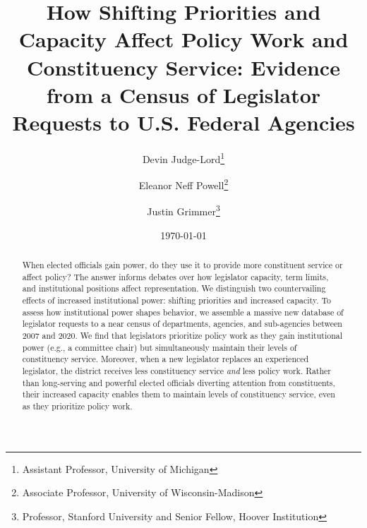 \documentclass[12pt]{article}
\title{How Shifting Priorities and Capacity Affect Policy Work and Constituency Service: Evidence from a Census of Legislator Requests to U.S. Federal Agencies}
\author{Devin Judge-Lord\thanks{Assistant Professor, University of Michigan} \and Eleanor Neff Powell\thanks{Associate Professor, University of Wisconsin-Madison} \and Justin Grimmer\thanks{Professor, Stanford University and Senior Fellow, Hoover Institution} }
\date{\today}
\begin{document}
\maketitle

\begin{abstract}
When elected officials gain power, do they use it to provide more constituent service or affect policy? The answer informs debates over how legislator capacity, term limits, and institutional positions affect representation. 
We distinguish two countervailing effects of increased institutional power: shifting priorities and increased capacity. 
To assess how institutional power shapes behavior, we assemble a massive new database of  legislator requests to a near census of departments, agencies, and sub-agencies between 2007 and 2020.
We find that legislators prioritize policy work as they gain institutional power (e.g., a committee chair) but simultaneously maintain their levels of constituency service.
Moreover, when a new legislator replaces an experienced legislator, the district receives less constituency service \textit{and} less policy work.
Rather than long-serving and powerful elected officials diverting attention from constituents, their increased capacity enables them to maintain levels of constituency service, even as they prioritize policy work.


\end{abstract}
\end{document}
